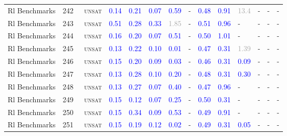 \begin{center}
{\begin{longtable}{@{}llllllllllllll@{}}
Rl Benchmarks & 242 & ~\textsc{unsat} & \textcolor{blue}{0.14} & \textcolor{blue}{0.21} & \textcolor{blue}{0.07} & \textcolor{blue}{0.59} & - & \textcolor{blue}{0.48} & \textcolor{blue}{0.91} & \textcolor{darkgray}{13.4} & - & - & - \\
Rl Benchmarks & 243 & ~\textsc{unsat} & \textcolor{blue}{0.51} & \textcolor{blue}{0.28} & \textcolor{blue}{0.33} & \textcolor{darkgray}{1.85} & - & \textcolor{blue}{0.51} & \textcolor{blue}{0.96} & - & - & - & - \\
Rl Benchmarks & 244 & ~\textsc{unsat} & \textcolor{blue}{0.16} & \textcolor{blue}{0.20} & \textcolor{blue}{0.07} & \textcolor{blue}{0.51} & - & \textcolor{blue}{0.50} & \textcolor{blue}{1.01} & - & - & - & - \\
Rl Benchmarks & 245 & ~\textsc{unsat} & \textcolor{blue}{0.13} & \textcolor{blue}{0.22} & \textcolor{blue}{0.10} & \textcolor{blue}{0.01} & - & \textcolor{blue}{0.47} & \textcolor{blue}{0.31} & \textcolor{darkgray}{1.39} & - & - & - \\
Rl Benchmarks & 246 & ~\textsc{unsat} & \textcolor{blue}{0.15} & \textcolor{blue}{0.20} & \textcolor{blue}{0.09} & \textcolor{blue}{0.03} & - & \textcolor{blue}{0.46} & \textcolor{blue}{0.31} & \textcolor{blue}{0.09} & - & - & - \\
Rl Benchmarks & 247 & ~\textsc{unsat} & \textcolor{blue}{0.13} & \textcolor{blue}{0.28} & \textcolor{blue}{0.10} & \textcolor{blue}{0.20} & - & \textcolor{blue}{0.48} & \textcolor{blue}{0.31} & \textcolor{blue}{0.30} & - & - & - \\
Rl Benchmarks & 248 & ~\textsc{unsat} & \textcolor{blue}{0.13} & \textcolor{blue}{0.27} & \textcolor{blue}{0.07} & \textcolor{blue}{0.40} & - & \textcolor{blue}{0.47} & \textcolor{blue}{0.96} & - & - & - & - \\
Rl Benchmarks & 249 & ~\textsc{unsat} & \textcolor{blue}{0.15} & \textcolor{blue}{0.12} & \textcolor{blue}{0.07} & \textcolor{blue}{0.25} & - & \textcolor{blue}{0.50} & \textcolor{blue}{0.31} & - & - & - & - \\
Rl Benchmarks & 250 & ~\textsc{unsat} & \textcolor{blue}{0.15} & \textcolor{blue}{0.34} & \textcolor{blue}{0.09} & \textcolor{blue}{0.53} & - & \textcolor{blue}{0.49} & \textcolor{blue}{0.91} & - & - & - & - \\
Rl Benchmarks & 251 & ~\textsc{unsat} & \textcolor{blue}{0.15} & \textcolor{blue}{0.19} & \textcolor{blue}{0.12} & \textcolor{blue}{0.02} & - & \textcolor{blue}{0.49} & \textcolor{blue}{0.31} & \textcolor{blue}{0.05} & - & - & - \\

\end{longtable}}
\end{center}
